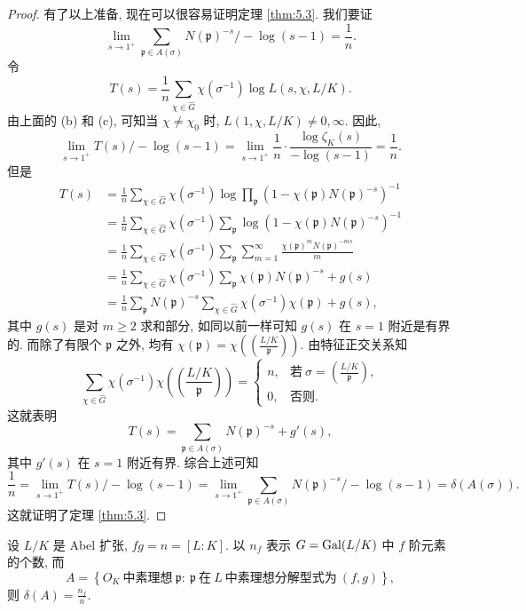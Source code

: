 \begin{proof}
有了以上准备, 现在可以很容易证明定理 \ref{thm:5.3}. 我们要证
\begin{equation}\tag{4}
  \lim_{s\to1^+}\sum_{\mathfrak{p}\in A(\sigma)}N(\mathfrak{p})^{-s}\big/-\log(s-1)=\frac{1}{n}.
\end{equation}
令
\[
  T(s)=\frac{1}{n}\sum_{\chi\in\widehat{G}}\chi(\sigma^{-1})\log L(s,\chi,L/K).
\]
由上面的 (b) 和 (c), 可知当 $\chi\neq\chi_0$ 时, $L(1,\chi,L/K)\neq 0,\infty$. 因此, 
\[
  \lim_{s\to1^+}T(s)/-\log(s-1)
  =\lim_{s\to1^+}\frac{1}{n}\cdot\frac{\log\zeta_K(s)}{-\log(s-1)}=\frac{1}{n}.
\]
但是
\begin{align*}
  T(s)&=\frac{1}{n}\sum_{\chi\in\widehat{G}}\chi(\sigma^{-1})\log\prod_{\mathfrak{p}}(1-\chi(\mathfrak{p})N(\mathfrak{p})^{-s})^{-1}\\
  &=\frac{1}{n}\sum_{\chi\in\widehat{G}}\chi(\sigma^{-1})\sum_{\mathfrak{p}}\log(1-\chi(\mathfrak{p})N(\mathfrak{p})^{-s})^{-1}\\
  &=\frac{1}{n}\sum_{\chi\in\widehat{G}}\chi(\sigma^{-1})\sum_{\mathfrak{p}}\sum_{m=1}^{\infty}\frac{\chi(\mathfrak{p})^mN(\mathfrak{p})^{-ms}}{m}\\
  &=\frac{1}{n}\sum_{\chi\in\widehat{G}}\chi(\sigma^{-1})\sum_{\mathfrak{p}}\chi(\mathfrak{p})N(\mathfrak{p})^{-s}+g(s)\\
  &=\frac{1}{n}\sum_{\mathfrak{p}}N(\mathfrak{p})^{-s}\sum_{\chi\in\widehat{G}}\chi(\sigma^{-1})\chi(\mathfrak{p})+g(s),
\end{align*}
其中 $g(s)$ 是对 $m\geqslant 2$ 求和部分, 如同以前一样可知 $g(s)$ 在 $s=1$ 附近是有界的. 而除了有限个 $\mathfrak{p}$ 之外, 均有 $\chi(\mathfrak{p})=\chi\left(\left(\frac{L/K}{\mathfrak{p}}\right)\right)$. 由特征正交关系知
\[
  \sum_{\chi\in\widehat{G}}\chi(\sigma^{-1})\chi\left(\left(\frac{L/K}{\mathfrak{p}}\right)\right)
  =\begin{cases}
    n, & \text{若}\ \sigma=\left(\frac{L/K}{\mathfrak{p}}\right),\\
    0, & \text{否则}.
  \end{cases}
\]
这就表明
\[
  T(s)=\sum_{\mathfrak{p}\in A(\sigma)}N(\mathfrak{p})^{-s}+g'(s),
\]
其中 $g'(s)$ 在 $s=1$ 附近有界. 综合上述可知
\[
  \frac{1}{n}=\lim_{s\to1^+}T(s)/-\log(s-1)
  =\lim_{s\to1^+}\sum_{\mathfrak{p}\in A(\sigma)}N(\mathfrak{p})^{-s}/-\log(s-1)
  =\delta(A(\sigma)).
\]
这就证明了定理 \ref{thm:5.3}. 
\end{proof}

\setcounter{corollary}{0}%

\begin{corollary}[1]
设 $L/K$ 是 Abel 扩张, $fg=n=[L:K]$. 以 $n_f$ 表示 $G=\operatorname{Gal}(L/K)$ 中 $f$ 阶元素的个数, 而
\[
  A=\left\{O_K\ \text{中素理想}\ \mathfrak{p}:\ \mathfrak{p}\ \text{在}\ L\ \text{中素理想分解型式为}\ (f,g)\right\},
\]
则 $\delta(A)=\frac{n_f}{n}$. 
\end{corollary}


